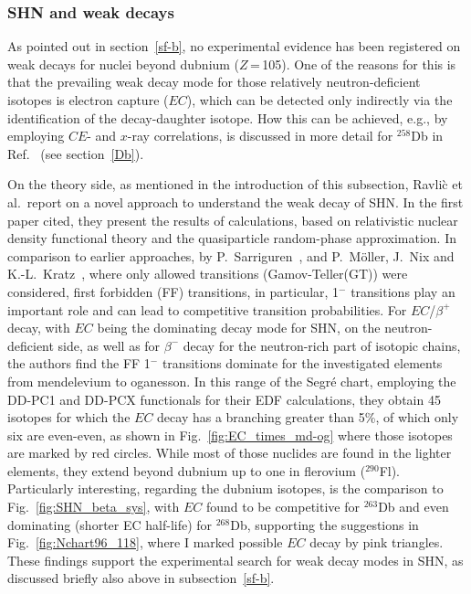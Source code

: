 \subsubsection{SHN and weak decays}\label{weak}

As pointed out in section~\ref{sf-b}, no experimental evidence has been registered on weak decays for nuclei beyond dubnium ($Z$\,=\,105). 
One of the reasons for this is that the prevailing weak decay mode for those relatively neutron-deficient isotopes is electron capture ($EC$), which can be detected only indirectly via the identification of the decay-daughter isotope.
How this can be achieved, e.g., by employing $CE$- and $x$-ray correlations, is discussed in more detail for $^{258}$Db in Ref.~\cite{Hessberger2016a} (see section~\ref{Db}).

On the theory side, as mentioned in the introduction of this subsection, Ravli\`{c} et al.~report on a novel approach to understand the weak decay of SHN. 
In the first paper cited, they present the results of calculations, based on relativistic nuclear density functional theory and the quasiparticle random-phase approximation. 
In comparison to earlier approaches, by P.~Sarriguren~\cite{Sarriguren2019,Sarriguren2020,Sarriguren2021,Sarriguren2022}, and P.~M\"{o}ller, J.~Nix and K.-L.~Kratz~\cite{Moeller1997}, where only allowed transitions (Gamov-Teller(GT)) were considered, first forbidden (FF) transitions, in particular, 1$^-$ transitions play an important role and can lead to competitive transition probabilities.
For $EC$/$\beta^+$ decay, with $EC$ being the dominating decay mode for SHN, on the neutron-deficient side, as well as for $\beta^-$ decay for the neutron-rich part of isotopic chains, the authors find the FF 1$^-$ transitions dominate for the investigated elements from mendelevium to oganesson.
In this range of the Segr\'{e} chart, employing the DD-PC1 and DD-PCX functionals for their EDF calculations, they obtain 45 isotopes for which the $EC$ decay has a branching greater than 5\%, of which only six are even-even, as shown in Fig.~\ref{fig:EC_times_md-og} where those isotopes are marked by red circles.
While most of those nuclides are found in the lighter elements, they extend beyond dubnium up to one in flerovium ($^{290}$Fl). 
Particularly interesting, regarding the dubnium isotopes, is the comparison to Fig.~\ref{fig:SHN_beta_sys}, with $EC$ found to be competitive for $^{263}$Db and even dominating (shorter EC half-life) for $^{268}$Db, supporting the suggestions in Fig.~\ref{fig:Nchart96_118}, where I marked possible $EC$ decay by pink triangles.
These findings support the experimental search for weak decay modes in SHN, as discussed briefly also above in subsection~\ref{sf-b}.

